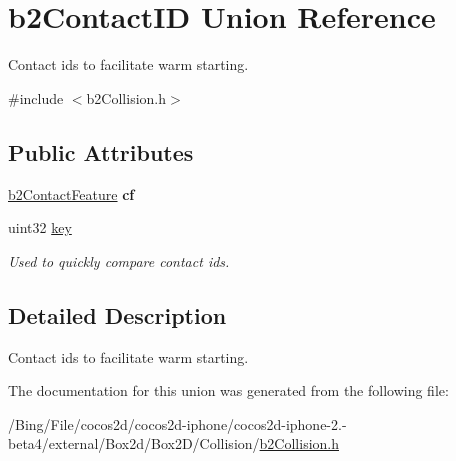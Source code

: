 \hypertarget{unionb2_contact_i_d}{\section{b2\-Contact\-I\-D Union Reference}
\label{unionb2_contact_i_d}
}


Contact ids to facilitate warm starting.  




{\ttfamily \#include $<$b2\-Collision.\-h$>$}

\subsection*{Public Attributes}
\begin{DoxyCompactItemize}
\item 
\hypertarget{unionb2_contact_i_d_a58b6732f909bc760f75e7aff3cd4be08}{\hyperlink{structb2_contact_feature}{b2\-Contact\-Feature} {\bfseries cf}}\label{unionb2_contact_i_d_a58b6732f909bc760f75e7aff3cd4be08}

\item 
\hypertarget{unionb2_contact_i_d_a04c04f8fdcb799b33552d01b3aa3f245}{uint32 \hyperlink{unionb2_contact_i_d_a04c04f8fdcb799b33552d01b3aa3f245}{key}}\label{unionb2_contact_i_d_a04c04f8fdcb799b33552d01b3aa3f245}

\begin{DoxyCompactList}\small\item\em Used to quickly compare contact ids. \end{DoxyCompactList}\end{DoxyCompactItemize}


\subsection{Detailed Description}
Contact ids to facilitate warm starting. 

The documentation for this union was generated from the following file\-:\begin{DoxyCompactItemize}
\item 
/\-Bing/\-File/cocos2d/cocos2d-\/iphone/cocos2d-\/iphone-\/2.-\/beta4/external/\-Box2d/\-Box2\-D/\-Collision/\hyperlink{b2_collision_8h}{b2\-Collision.\-h}\end{DoxyCompactItemize}

